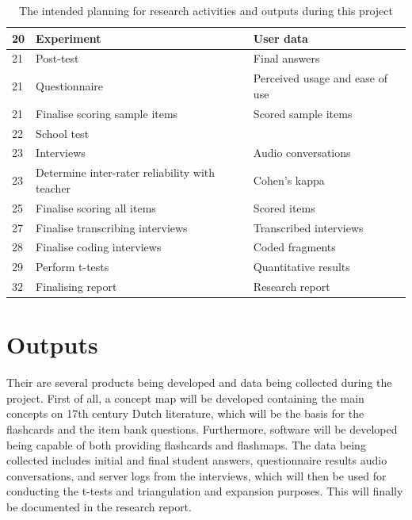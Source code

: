 \documentclass[11pt,twoside]{report} %
\begin{document}
\begin{table}
\begin{tabular}{ l | p{} | p{}}
        20 & Experiment & User data \\ \hline
        21 & Post-test & Final answers \\ \hline
        21 & Questionnaire & Perceived usage and ease of use \\ \hline
        21 & Finalise scoring sample items & Scored sample items \\ \hline
        22 & School test & \\ \hline
        23 & Interviews & Audio conversations \\ \hline
        23 & Determine inter-rater reliability with teacher & Cohen's kappa \\ \hline
        25 & Finalise scoring all items & Scored items \\ \hline
        27 & Finalise transcribing interviews & Transcribed interviews \\ \hline
        28 & Finalise coding interviews & Coded fragments \\ \hline
        29 & Perform t-tests & Quantitative results \\ \hline
        32 & Finalising report & Research report \\
    \end{tabular}
    \caption{The intended planning for research activities and outputs during this project \label{tab:planning}}
\end{table}

\section{Outputs}


Their are several products being developed and data being collected during the project. First of all, a concept map will be developed containing the main concepts on 17th century Dutch literature, which will be the basis for the flashcards and the item bank questions. Furthermore, software will be developed being capable of both providing flashcards and flashmaps. The data being collected includes initial and final student answers, questionnaire results audio conversations, and server logs from the interviews, which will then be used for conducting the t-tests and triangulation and expansion purposes. This will finally be documented in the research report.



\thispagestyle{fancy}
\end{document}
